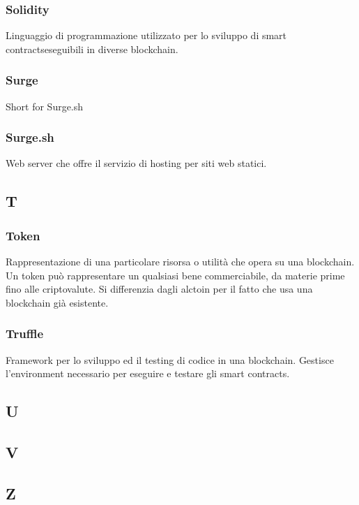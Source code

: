 \subsubsection*{Solidity}
Linguaggio di programmazione utilizzato per lo sviluppo di smart contracts\glosp eseguibili in diverse blockchain\glo.

\subsubsection*{Surge}
Short for Surge.sh

\subsubsection*{Surge.sh}
Web server che offre il servizio di hosting per siti web statici.


\subsection*{T}

\subsubsection*{Token}
Rappresentazione di una particolare risorsa o utilità che opera su una blockchain\glo. Un token può rappresentare un qualsiasi bene commerciabile, da materie prime fino alle criptovalute. Si differenzia dagli alctoin per il fatto che usa una blockchain già esistente.

\subsubsection*{Truffle}
Framework per lo sviluppo ed il testing di codice in una blockchain\glo. Gestisce l'environment necessario per eseguire e testare gli smart contracts\glo.


\subsection*{U}


\subsection*{V}

\subsection*{Z}
